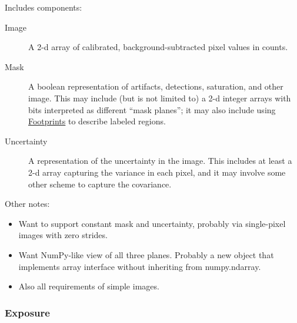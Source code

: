 Includes components:
\begin{description}
\item[Image] A 2-d array of calibrated, background-subtracted pixel values in counts.
\item[Mask] A boolean representation of artifacts, detections, saturation, and other image.  This may include (but is not limited to) a 2-d integer arrays with bits interpreted as different ``mask planes''; it may also include using \hyperref[sec:spFootprints]{Footprints} to describe labeled regions.
\item[Uncertainty] A representation of the uncertainty in the image.  This includes at least a 2-d array capturing the variance in each pixel, and it may involve some other scheme to capture the covariance.
\end{description}

Other notes:
\begin{itemize}
\item Want to support constant mask and uncertainty, probably via single-pixel images with zero strides.
\item Want NumPy-like view of all three planes.  Probably a new object that implements array interface without inheriting from numpy.ndarray.
\item Also all requirements of simple images.
\end{itemize}

\subsubsection{Exposure}
\label{sec:spImagesExposure}

